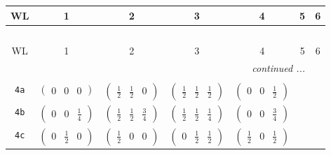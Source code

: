 \documentclass[fleqn,9pt,landscape]{jsarticle}
\begin{document}
\begin{center}
\renewcommand{\arraystretch}{1.2}
\begin{longtable}{ccccccc}
 \hline \hline
WL & 1 & 2 & 3 & 4 & 5 & 6 \\ \hline \endfirsthead

\multicolumn{6}{l}{\tablename\ \thetable{}} \\
 \hline \hline
WL & 1 & 2 & 3 & 4 & 5 & 6 \\ \hline \endhead

 \hline \hline
\multicolumn{6}{r}{\footnotesize\it continued ...} \\ \endfoot

 \hline \hline
\multicolumn{6}{r}{} \\ \endlastfoot

{\tt 4a} & $ \begin{pmatrix} 0 & 0 & 0 \end{pmatrix} $ & $ \begin{pmatrix} \frac{1}{2} & \frac{1}{2} & 0 \end{pmatrix} $ & $ \begin{pmatrix} \frac{1}{2} & \frac{1}{2} & \frac{1}{2} \end{pmatrix} $ & $ \begin{pmatrix} 0 & 0 & \frac{1}{2} \end{pmatrix} $ & $  $ & $  $ \\ \hline
{\tt 4b} & $ \begin{pmatrix} 0 & 0 & \frac{1}{4} \end{pmatrix} $ & $ \begin{pmatrix} \frac{1}{2} & \frac{1}{2} & \frac{3}{4} \end{pmatrix} $ & $ \begin{pmatrix} \frac{1}{2} & \frac{1}{2} & \frac{1}{4} \end{pmatrix} $ & $ \begin{pmatrix} 0 & 0 & \frac{3}{4} \end{pmatrix} $ & $  $ & $  $ \\ \hline
{\tt 4c} & $ \begin{pmatrix} 0 & \frac{1}{2} & 0 \end{pmatrix} $ & $ \begin{pmatrix} \frac{1}{2} & 0 & 0 \end{pmatrix} $ & $ \begin{pmatrix} 0 & \frac{1}{2} & \frac{1}{2} \end{pmatrix} $ & $ \begin{pmatrix} \frac{1}{2} & 0 & \frac{1}{2} \end{pmatrix} $ & $  $ & $  $ \\ \hline

\end{longtable}
\end{center}
\end{document}
